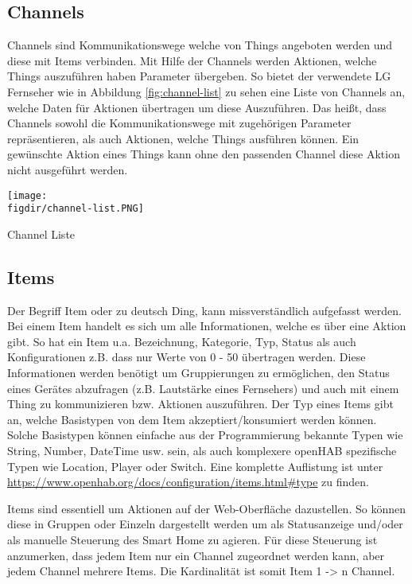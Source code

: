 \subsection{Channels} \label{sec:channels}
Channels sind Kommunikationswege welche von Things angeboten werden und diese mit Items verbinden. Mit Hilfe der Channels werden Aktionen, welche Things auszuführen haben Parameter übergeben. So bietet der verwendete LG Fernseher wie in Abbildung \ref{fig:channel-list} zu sehen eine Liste von Channels an, welche Daten für Aktionen übertragen um diese Auszuführen. Das heißt, dass Channels sowohl die Kommunikationswege mit zugehörigen Parameter repräsentieren, als auch Aktionen, welche Things ausführen können. Ein gewünschte Aktion eines Things kann ohne den passenden Channel diese Aktion nicht ausgeführt werden.

{
	\centering
	\captionsetup{type=figure}
	\texttt{[image: \\figdir/channel-list.PNG]}
	\caption{Channel Liste\label{fig:channel-list}}
}

\subsection{Items}
Der Begriff Item oder zu deutsch Ding, kann missverständlich aufgefasst werden. Bei einem Item handelt es sich um alle Informationen, welche es über eine Aktion gibt. So hat ein Item u.a. Bezeichnung, Kategorie, Typ, Status als auch Konfigurationen z.B. dass nur Werte von 0 - 50 übertragen werden. Diese Informationen werden benötigt um Gruppierungen zu ermöglichen, den Status eines Gerätes abzufragen (z.B. Lautstärke eines Fernsehers) und auch mit einem Thing zu kommunizieren bzw. Aktionen auszuführen. Der Typ eines Items gibt an, welche Basistypen von dem Item akzeptiert/konsumiert werden können. Solche Basistypen können einfache aus der Programmierung bekannte Typen wie String, Number, DateTime usw. sein, als auch komplexere openHAB spezifische Typen wie Location, Player oder Switch. Eine komplette Auflistung ist unter \url{https://www.openhab.org/docs/configuration/items.html#type} zu finden.

Items sind essentiell um Aktionen auf der Web-Oberfläche dazustellen. So können diese in Gruppen oder Einzeln dargestellt werden um als Statusanzeige und/oder als manuelle Steuerung des Smart Home zu agieren. Für diese Steuerung ist anzumerken, dass jedem Item nur ein Channel zugeordnet werden kann, aber jedem Channel mehrere Items. Die Kardinalität ist somit Item 1 -> n Channel. 

